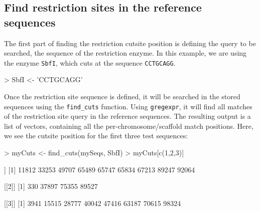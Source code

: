 \documentclass{article}
\begin{document}
\subsection{Find restriction sites in the reference sequences}
The first part of finding the restriction cutsite position is defining the query to be searched, the sequence of the restriction enzyme. In this example, we are using the enzyme \texttt{SbfI}, which cuts at the sequence \texttt{CCTGCAGG}.
\begin{Schunk}
\begin{Sinput}
> SbfI <- 'CCTGCAGG'
\end{Sinput}
\end{Schunk}
Once the restriction site sequence is defined, it will be searched in the stored sequences using the \texttt{find\_cuts} function. Using \texttt{gregexpr}, it will find all matches of the restriction site query in the reference sequences. The resulting output is a list of vectors, containing all the per-chromosome/scaffold match positions.
\bigbreak
Here, we see the cutsite position for the first three test sequences:

\begin{Schunk}
\begin{Sinput}
> myCuts <- find_cuts(mySeqs, SbfI)
> myCuts[c(1,2,3)]
\end{Sinput}
\begin{Soutput}
[[1]]
[1] 11812 33253 49707 65489 65747 65834 67213 89247 92064

[[2]]
[1]   330 37897 75355 89527

[[3]]
[1]  3941 15515 28777 40042 47416 63187 70615 98324
\end{Soutput}
\end{Schunk}
\end{document}
